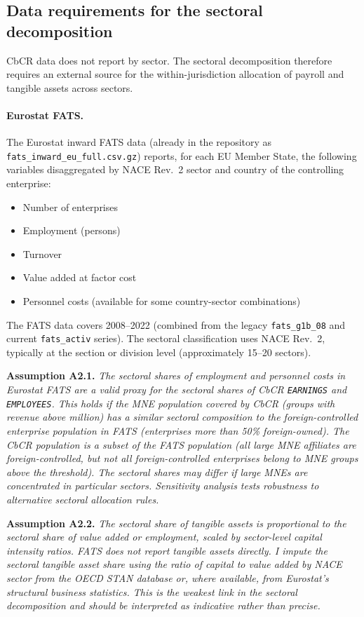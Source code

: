 \documentclass[11pt,a4paper]{article}
\newcommand{\EUR}{\texteuro}
\newcommand{\code}[1]{\texttt{#1}}
\newcommand{\assumption}[2]{\noindent\textbf{Assumption #1.} \textit{#2}\medskip}
\begin{document}
\subsection{Data requirements for the sectoral decomposition}\label{sec:sbie_data}

CbCR data does not report by sector. The sectoral decomposition therefore requires an external source for the within-jurisdiction allocation of payroll and tangible assets across sectors.

\paragraph{Eurostat FATS.} The Eurostat inward FATS data (already in the repository as \code{fats\_inward\_eu\_full.csv.gz}) reports, for each EU Member State, the following variables disaggregated by NACE Rev.~2 sector and country of the controlling enterprise:

\begin{itemize}
\item Number of enterprises
\item Employment (persons)
\item Turnover
\item Value added at factor cost
\item Personnel costs (available for some country-sector combinations)
\end{itemize}

The FATS data covers 2008--2022 (combined from the legacy \code{fats\_g1b\_08} and current \code{fats\_activ} series). The sectoral classification uses NACE Rev.~2, typically at the section or division level (approximately 15--20 sectors).

\assumption{A2.1}{The sectoral shares of employment and personnel costs in Eurostat FATS are a valid proxy for the sectoral shares of CbCR \code{EARNINGS} and \code{EMPLOYEES}. This holds if the MNE population covered by CbCR (groups with revenue above \EUR750 million) has a similar sectoral composition to the foreign-controlled enterprise population in FATS (enterprises more than 50\% foreign-owned). The CbCR population is a subset of the FATS population (all large MNE affiliates are foreign-controlled, but not all foreign-controlled enterprises belong to MNE groups above the threshold). The sectoral shares may differ if large MNEs are concentrated in particular sectors. Sensitivity analysis tests robustness to alternative sectoral allocation rules.}

\assumption{A2.2}{The sectoral share of tangible assets is proportional to the sectoral share of value added or employment, scaled by sector-level capital intensity ratios. FATS does not report tangible assets directly. I impute the sectoral tangible asset share using the ratio of capital to value added by NACE sector from the OECD STAN database or, where available, from Eurostat's structural business statistics. This is the weakest link in the sectoral decomposition and should be interpreted as indicative rather than precise.}
\end{document}
